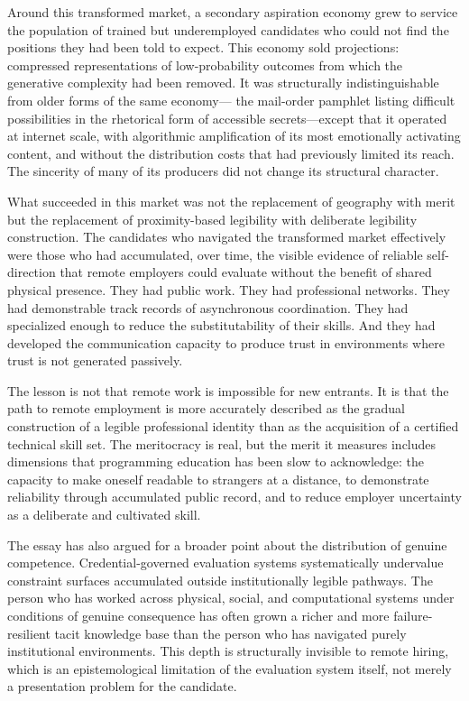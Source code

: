 \documentclass[12pt, a4paper]{article}
\theoremstyle{plain}
\theoremstyle{definition}
\theoremstyle{remark}
\begin{document}
Around this transformed market, a secondary aspiration economy grew
to service the population of trained but underemployed candidates
who could not find the positions they had been told to expect.
This economy sold projections: compressed representations of
low-probability outcomes from which the generative complexity had been removed.
It was structurally indistinguishable from older forms of the same economy---
the mail-order pamphlet listing difficult possibilities in the rhetorical form
of accessible secrets---except that it operated at internet scale,
with algorithmic amplification of its most emotionally activating content,
and without the distribution costs that had previously limited its reach.
The sincerity of many of its producers did not change its structural character.

What succeeded in this market was not the replacement of geography with merit
but the replacement of proximity-based legibility with deliberate legibility construction.
The candidates who navigated the transformed market effectively
were those who had accumulated, over time, the visible evidence of reliable self-direction
that remote employers could evaluate without the benefit of shared physical presence.
They had public work. They had professional networks.
They had demonstrable track records of asynchronous coordination.
They had specialized enough to reduce the substitutability of their skills.
And they had developed the communication capacity to produce trust
in environments where trust is not generated passively.

The lesson is not that remote work is impossible for new entrants.
It is that the path to remote employment is more accurately described
as the gradual construction of a legible professional identity
than as the acquisition of a certified technical skill set.
The meritocracy is real, but the merit it measures includes dimensions
that programming education has been slow to acknowledge:
the capacity to make oneself readable to strangers at a distance,
to demonstrate reliability through accumulated public record,
and to reduce employer uncertainty as a deliberate and cultivated skill.

The essay has also argued for a broader point about the distribution of genuine competence.
Credential-governed evaluation systems systematically undervalue
constraint surfaces accumulated outside institutionally legible pathways.
The person who has worked across physical, social, and computational systems
under conditions of genuine consequence has often grown a richer and
more failure-resilient tacit knowledge base than the person
who has navigated purely institutional environments.
This depth is structurally invisible to remote hiring,
which is an epistemological limitation of the evaluation system itself,
not merely a presentation problem for the candidate.
\end{document}
